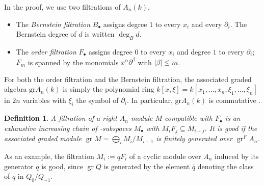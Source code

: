 \documentclass[11pt]{amsart}
\numberwithin{equation}{section}
\theoremstyle{plain}
\newtheorem{definition}[theorem]{Definition}
\theoremstyle{remark}
\newcommand{\gr}{\operatorname{gr}}
\begin{document}
In the proof, we use two filtrations of $A_n(k)$.
\begin{itemize}[nosep,leftmargin=1.4em]
\item The \emph{Bernstein filtration} $B_\bullet$ assigns degree $1$ to every
  $x_i$ and every $\partial_i$. The Bernstein degree of $d$ is
  written $\deg_B d$.
\item The \emph{order filtration} $F_\bullet$ assigns degree $0$ to every $x_i$
  and degree $1$ to every $\partial_i$; $F_m$ is spanned by the monomials
  $x^\alpha\partial^\beta$ with $|\beta|\le m$.  %
\end{itemize}
For both the order filtration and the Bernstein filtration, the associated graded algebra $\mathrm{gr} A_n(k)$ is simply the polynomial ring $k[x,\xi]=k[x_1,\dots,x_n,\xi_1,\dots,\xi_n]$ in $2n$ variables with $\xi_i$ the symbol of $\partial_i$. In particular, $\mathrm{gr} A_n(k)$ is commutative \cite[]{SchnellNotes}.

\begin{definition}\label{def:good-filtration}
A filtration of a right $A_n$-module $M$ compatible with $F_\bullet$
is an exhaustive increasing chain of -subspaces $M_\bullet$ with
$M_iF_j\subseteq M_{i+j}$. It is \emph{good} if the associated graded module
$\gr M=\bigoplus_iM_i/M_{i-1}$ is finitely generated over $\gr^FA_n$.
\end{definition}
As an example, the filtration $M_i:=qF_i$ of a cyclic module over $A_n$ induced by its generator $q$ is good, since $\gr Q$ is generated by the element $\bar{q}$ denoting the class of $q$ in $Q_0/Q_{-1}.$
\end{document}
